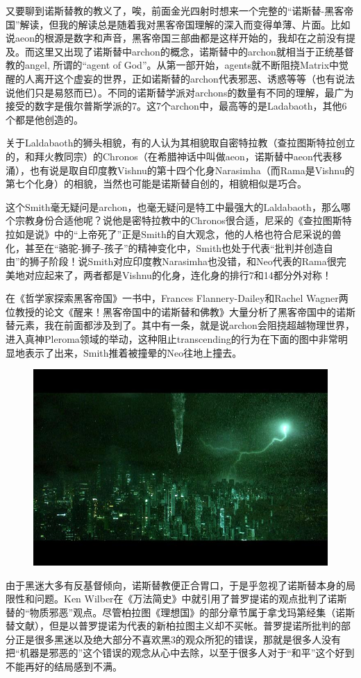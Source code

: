 \documentclass[UTF8]{ctexart}
\begin{document}
又要聊到诺斯替教的教义了，唉，前面金光四射时想来一个完整的“诺斯替-黑客帝国”解读，但我的解读总是随着我对黑客帝国理解的深入而变得单薄、片面。比如说aeon的根源是数字和声音，黑客帝国三部曲都是这样开始的，我却在之前没有提及。而这里又出现了诺斯替中archon的概念，诺斯替中的archon就相当于正统基督教的angel, 所谓的“agent of God”。从第一部开始，agents就不断阻挠Matrix中觉醒的人离开这个虚妄的世界，正如诺斯替的archon代表邪恶、诱惑等等（也有说法说他们只是易怒而已）。不同的诺斯替学派对archons的数量有不同的理解，最广为接受的数字是俄尔普斯学派的7。这7个archon中，最高等的是Ladabaoth，其他6个都是他创造的。

关于Laldabaoth的狮头相貌，有的人认为其相貌取自密特拉教（查拉图斯特拉创立的，和拜火教同宗）的Chronos（在希腊神话中叫做aeon，诺斯替中aeon代表移涌），也有说是取自印度教Vishnu的第十四个化身Narasimha（而Rama是Vishnu的第七个化身）的相貌，当然也可能是诺斯替自创的，相貌相似是巧合。

这个Smith毫无疑问是archon，也毫无疑问是特工中最强大的Laldabaoth，那么哪个宗教身份合适他呢？说他是密特拉教中的Chronos很合适，尼采的《查拉图斯特拉如是说》中的“上帝死了”正是Smith的自大观念，他的人格也符合尼采说的兽化，甚至在“骆驼-狮子-孩子”的精神变化中，Smith也处于代表“批判并创造自由”的狮子阶段！说Smith对应印度教Narasimha也没错，和Neo代表的Rama很完美地对应起来了，两者都是Vishnu的化身，连化身的排行7和14都分外对称！

在《哲学家探索黑客帝国》一书中，Frances Flannery-Dailey和Rachel Wagner两位教授的论文《醒来！黑客帝国中的诺斯替和佛教》大量分析了黑客帝国中的诺斯替元素，我在前面都涉及到了。其中有一条，就是说archon会阻挠超越物理世界，进入真神Pleroma领域的举动，这种阻止transcending的行为在下面的图中非常明显地表示了出来，Smith推着被撞晕的Neo往地上撞去。

\begin{figure}[htb]
\centering
\includegraphics[width=0.5\linewidth]{fig/677dbf0920e199276b60fb8c.jpg}
\end{figure}

由于黑迷大多有反基督倾向，诺斯替教便正合胃口，于是乎忽视了诺斯替本身的局限性和问题。Ken Wilber在《万法简史》中就引用了普罗提诺的观点批判了诺斯替的“物质邪恶”观点。尽管柏拉图《理想国》的部分章节属于拿戈玛第经集（诺斯替文献），但是以普罗提诺为代表的新柏拉图主义却不买帐。普罗提诺所批判的部分正是很多黑迷以及绝大部分不喜欢黑3的观众所犯的错误，那就是很多人没有把“机器是邪恶的”这个错误的观念从心中去除，以至于很多人对于“和平”这个好到不能再好的结局感到不满。
\end{document}

